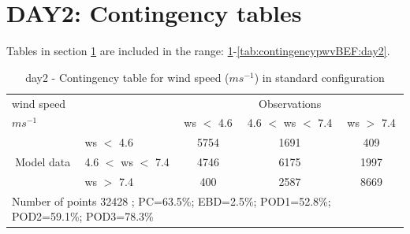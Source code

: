 \section{DAY2: Contingency tables}\label{sec:day2:cont}
Tables in section \ref{sec:day2:cont} are included in the range: \ref{tab:contingencywsBEF:day2}-\ref{tab:contingencypwvBEF:day2}.
\begin{table}[h!]
\begin{center}
\begin{tabular}{llccc}
\hline
{wind speed}                                       &                                                    & \multicolumn{3}{c}{Observations}                 \\
{$m s^{-1}$}                                       &                             & ws $<$ 4.6   & 4.6 $<$ ws $<$ 7.4 & ws $>$ 7.4 \\
\hline
\multicolumn{1}{c}{\multirow{3}{*}{Model data}}  & ws $<$ 4.6             & 5754                & 1691                       & 409              \\
                                                 & 4.6  $<$ ws $<$ 7.4 & 4746                & 6175                       & 1997              \\
                                                 & ws $>$ 7.4             & 400                & 2587                       & 8669              \\
\hline 
\multicolumn{5}{l}{ Number of points        32428 ; PC=63.5\%; EBD=2.5\%; POD1=52.8\%; POD2=59.1\%; POD3=78.3\%}                 \\
\end{tabular}
\end{center}
\caption{day2 - Contingency table for {wind speed} ($m s^{-1}$) in standard configuration}
\label{tab:contingencywsBEF:day2}
\end{table}
